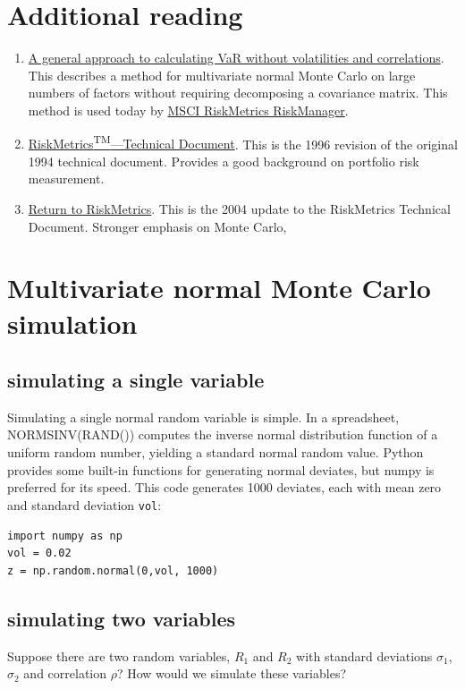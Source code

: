 \documentclass{report}
\numberwithin{problem}{chapter} %
\begin{document}
\begin{appendices}
\chapter{Additional reading}
\begin{enumerate}
\item{\href{http://pbenson.github.io/docs/rmm2q97bz.pdf}{A general approach to calculating VaR without volatilities and correlations}. This describes a method for multivariate normal Monte Carlo on large numbers of factors without requiring decomposing a covariance matrix. This method is used today by \href{https://www.msci.com/risk-performance}{MSCI RiskMetrics RiskManager}.}
\item{\href{http://pbenson.github.io/docs/td4e.pdf}{RiskMetrics\textsuperscript{TM}---Technical Document}. This is the 1996 revision of the original 1994 technical document. Provides a good background on portfolio risk measurement.}
\item{\href{http://pbenson.github.io/docs/ReturnToRiskMetrics.pdf}{Return to RiskMetrics}. This is the 2004 update to the  RiskMetrics Technical Document. Stronger emphasis on Monte Carlo, }
\end{enumerate}

\chapter{Multivariate normal Monte Carlo simulation}
\section{simulating a single variable}
Simulating a single normal random variable is simple. In a spreadsheet, NORMSINV(RAND()) computes the inverse normal distribution function of a uniform random number, yielding a standard normal random value. Python provides some built-in functions for generating normal deviates, but numpy is preferred for its speed. This code generates 1000 deviates, each with mean zero and standard deviation \texttt{vol}:

\begin{lstlisting}
import numpy as np
vol = 0.02
z = np.random.normal(0,vol, 1000)
\end{lstlisting}

\section{simulating two variables}
Suppose there are two random variables, $R_1$ and $R_2$ with standard deviations $\sigma_1$, $\sigma_2$ and correlation $\rho$? How would we simulate these variables?


\end{appendices}
\end{document}
